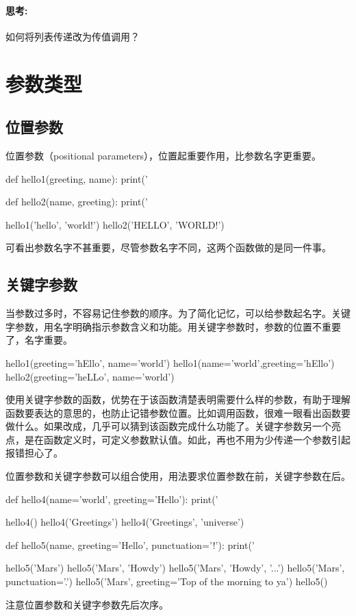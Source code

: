 \paragraph{思考: }  如何将列表传递改为传值调用？

\section{参数类型}
\subsection{位置参数}
位置参数（positional parameters），位置起重要作用，比参数名字更重要。
\begin{python}
def hello1(greeting, name):
    print('%

def hello2(name, greeting):
    print('%

hello1('hello', 'world!')
hello2('HELLO', 'WORLD!')
\end{python}
可看出参数名字不甚重要，尽管参数名字不同，这两个函数做的是同一件事。
\subsection{关键字参数}
当参数过多时，不容易记住参数的顺序。为了简化记忆，可以给参数起名字。关键字参数，用名字明确指示参数含义和功能。用关键字参数时，参数的位置不重要了，名字重要。
\begin{python}
  hello1(greeting='hEllo', name='world')
  hello1(name='world',greeting='hEllo')
  hello2(greeting='heLLo', name='world')
\end{python}
使用关键字参数的函数，优势在于该函数清楚表明需要什么样的参数，有助于理解函数要表达的意思的，也防止记错参数位置。比如调用函数，很难一眼看出函数要做什么。如果改成，几乎可以猜到该函数完成什么功能了。关键字参数另一个亮点，是在函数定义时，可定义参数默认值。如此，再也不用为少传递一个参数引起报错担心了。

位置参数和关键字参数可以组合使用，用法要求位置参数在前，关键字参数在后。
\begin{python}
def hello4(name='world', greeting='Hello'):
    print('%

hello4()
hello4('Greetings')
hello4('Greetings', 'universe')

def hello5(name, greeting='Hello', punctuation='!'):
    print('%

hello5('Mars')
hello5('Mars', 'Howdy')
hello5('Mars', 'Howdy', '...')
hello5('Mars', punctuation='.')
hello5('Mars', greeting='Top of the morning to ya')
hello5()
\end{python}
注意位置参数和关键字参数先后次序。
